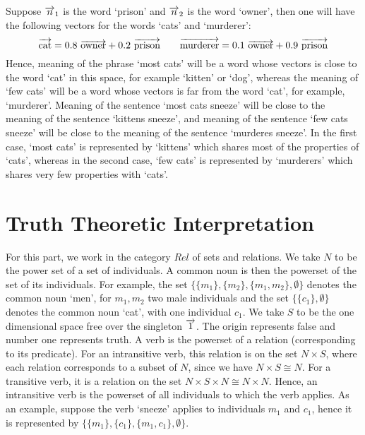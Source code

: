 %
%
Suppose $\overrightarrow{n}_1$ is the word  `prison' and $\overrightarrow{n}_2$ is the word `owner', then one will have the following vectors for the words `cats' and `murderer':
\[
\overrightarrow{\text{cat}} = 0.8 \  \overrightarrow{\text{owner}} + 0.2 \ \overrightarrow{\text{prison}}
\qquad
\overrightarrow{\text{murderer}} = 0.1\  \overrightarrow{\text{owner}} + 0.9 \  \overrightarrow{\text{prison}}
\]
Hence,  meaning of the phrase   `most cats' will  be a word whose vectors is close to the word `cat' in this space, for example `kitten' or `dog', whereas the meaning of `few cats' will be a word whose vectors is far from the word `cat', for example, `murderer'.  Meaning of the sentence `most cats sneeze' will be close to the meaning of the sentence `kittens sneeze', and  meaning of the sentence `few cats sneeze' will be close to  the meaning of the sentence `murderes sneeze'.  In the first case, `most cats' is represented by `kittens' which shares most of the properties of `cats', whereas in the second case, `few cats' is represented by `murderers' which shares very few properties with `cats'. 




\section{Truth Theoretic Interpretation}
For this part, we work in the category $Rel$ of sets and relations.  We take $N$ to be the power set of a set of individuals. A common noun is then the powerset of the set of its individuals.    For example,   the set  $\{\{m_1\}, \{m_2\}, \{m_1, m_2\}, \emptyset\}$ denotes the  common noun `men', for $m_1, m_2$ two male individuals and the set $\{\{c_1\}, \emptyset\}$ denotes  the common noun `cat', with one individual $c_1$.  We take $S$ to be the one dimensional space free over the singleton $\overrightarrow{1}$. The  origin represents false and   number  one  represents truth.   A verb is the powerset of a relation (corresponding to its predicate). For an intransitive verb, this relation is on the set $N \times S$, where each relation corresponds to a subset of $N$, since we have $N \times S \cong N$.  For a transitive verb, it is a relation on the set $N \times S \times N \cong N \times N$. Hence, an intransitive verb is the powerset of all individuals to which the verb applies. As an example, suppose the verb `sneeze'  applies to individuals $m_1$ and $c_1$, hence it is represented by $\{\{m_1\}, \{c_1\}, \{m_1, c_1\}, \emptyset\}$.  


